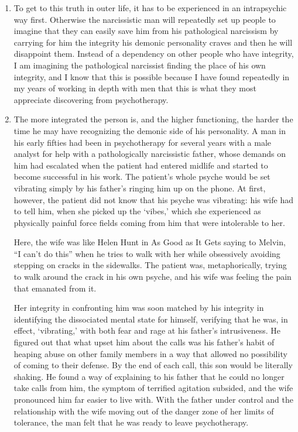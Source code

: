 \begin{enumerate}
\item {} To get to this truth
in outer life, it has to be experienced in an intrapsychic way first. Otherwise
the narcissistic man will repeatedly set up people to imagine that they can
easily save him from his pathological narcissism by carrying for him the
integrity his demonic personality craves and then he will disappoint them.
Instead of a dependency on other people who have integrity, I am imagining the
pathological narcissist finding the place of his own integrity, and I know that
this is possible because I have found repeatedly in my years of working in
depth with men that this is what they most appreciate discovering from
psychotherapy.

\item {}
The more integrated the person is, and the higher functioning, the harder the
time he may have recognizing the demonic side of his personality. A man in his
early fifties had been in psychotherapy for several years with a male analyst
for help with a pathologically narcissistic father, whose demands on him had
escalated when the patient had entered midlife and started to become successful
in his work. The patient’s whole psyche would be set vibrating simply by his
father’s ringing him up on the phone. At first, however, the patient did not
know that his psyche was vibrating: his wife had to tell him, when she picked
up the ‘vibes,’ which she experienced as physically painful force fields coming
from him that were intolerable to her.

Here, the wife was like Helen Hunt in As Good as It Gets saying to Melvin, “I
can’t do this” when he tries to walk with her while obsessively avoiding
stepping on cracks in the sidewalks. The patient was, metaphorically, trying to
walk around the crack in his own psyche, and his wife was feeling the pain that
emanated from it.

Her integrity in confronting him was soon matched by his integrity in
identifying the dissociated mental state for himself, verifying that he was, in
effect, ‘vibrating,’ with both fear and rage at his father’s intrusiveness. He
figured out that what upset him about the calls was his father’s habit of
heaping abuse on other family members in a way that allowed no possibility of
coming to their defense. By the end of each call, this son would be literally
shaking. He found a way of explaining to his father that he could no longer
take calls from him, the symptom of terrified agitation subsided, and the wife
pronounced him far easier to live with. With the father under control and the
relationship with the wife moving out of the danger zone of her limits of
tolerance, the man felt that he was ready to leave psychotherapy.


\end{enumerate}
